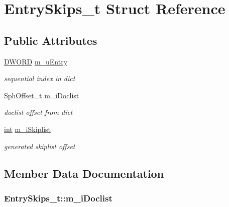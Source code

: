\hypertarget{structEntrySkips__t}{\section{Entry\-Skips\-\_\-t Struct Reference}
\label{structEntrySkips__t}
}
\subsection*{Public Attributes}
\begin{DoxyCompactItemize}
\item 
\hyperlink{sphinxstd_8h_a798af1e30bc65f319c1a246cecf59e39}{D\-W\-O\-R\-D} \hyperlink{structEntrySkips__t_acae8bb6bab57a4bacd418ced0f24d0d3}{m\-\_\-u\-Entry}
\begin{DoxyCompactList}\small\item\em sequential index in dict \end{DoxyCompactList}\item 
\hyperlink{sphinx_8h_a0fb3b64afebef33c61367714754eaa90}{Sph\-Offset\-\_\-t} \hyperlink{structEntrySkips__t_a0b028423eea7100bc3981948eceafe57}{m\-\_\-i\-Doclist}
\begin{DoxyCompactList}\small\item\em doclist offset from dict \end{DoxyCompactList}\item 
\hyperlink{sphinxexpr_8cpp_a4a26e8f9cb8b736e0c4cbf4d16de985e}{int} \hyperlink{structEntrySkips__t_a9c9d8e04bfbc91b6624411e015e7059f}{m\-\_\-i\-Skiplist}
\begin{DoxyCompactList}\small\item\em generated skiplist offset \end{DoxyCompactList}\end{DoxyCompactItemize}


\subsection{Member Data Documentation}
\hypertarget{structEntrySkips__t_a0b028423eea7100bc3981948eceafe57}{
\subsubsection[{m\-\_\-i\-Doclist}]{ Entry\-Skips\-\_\-t\-::m\-\_\-i\-Doclist}}\label{structEntrySkips__t_a0b028423eea7100bc3981948eceafe57}


